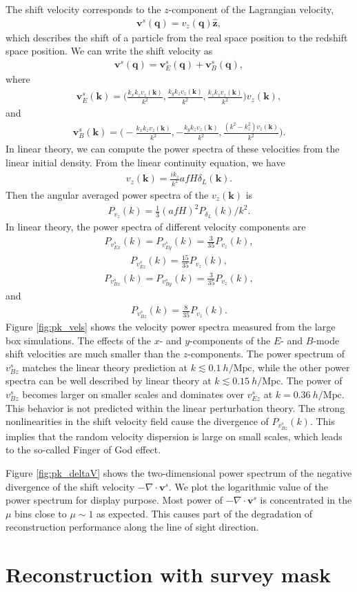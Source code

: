\documentclass[aps,prd,twocolumn,superscriptaddress,groupedaddress,nofootinbib,amsfont]{revtex4}  %
\newcommand{\mr}{\mathrm}
\newcommand{\bea}{\begin{eqnarray}}
\newcommand{\eea}{\end{eqnarray}}
\newcommand{\bmv}{\bm{v}}
\newcommand{\bmk}{\bm{k}}
\newcommand{\bmq}{\bm{q}}
\begin{document}
The shift velocity corresponds to the $z$-component of the Lagrangian velocity,
\bea
\bmv^s(\bmq)=v_z(\bmq)\hat{\bm{z}},
\eea
which describes the shift of a particle from the real space position to the 
redshift space position. We can write the shift velocity as 
\bea
\bmv^s(\bmq)=\bmv_E^s(\bmq)+\bmv^s_B(\bmq),
\eea
where 
\bea
\bmv^s_E(\bmk)=\bigg(\frac{k_xk_zv_z(\bmk)}{k^2},\frac{k_yk_zv_z(\bmk)}{k^2},\frac{k_zk_zv_z(\bmk)}{k^2}\bigg)v_z(\bmk),
\eea
and 
\bea
\bmv^s_B(\bmk)=\bigg(-\frac{k_xk_zv_z(\bmk)}{k^2},-\frac{k_yk_zv_z(\bmk)}{k^2},\frac{(k^2-k_z^2)v_z(\bmk)}{k^2}\bigg).
\eea
In linear theory, we can compute the power spectra of these velocities from the 
linear initial density.
From the linear continuity equation, we have 
\bea
v_z(\bmk)=\frac{ik_z}{k^2}afH\delta_L(\bmk).
\eea
Then the angular averaged power spectra of the $v_z(\bmk)$ is
\bea
P_{v_z}(k)=\frac{1}{3}(afH)^2P_{\delta_L}(k)/{k^2}.
\eea
In linear theory, the power spectra of different velocity components are
\bea
P_{v^s_{Ex}}(k)=P_{v^s_{Ey}}(k)=\frac{3}{35}P_{v_z}(k),
\eea
\bea
P_{v^s_{Ez}}(k)=\frac{15}{35}P_{v_z}(k),
\eea
\bea
P_{v^s_{Bx}}(k)=P_{v^s_{By}}(k)=\frac{3}{35}P_{v_z}(k),
\eea
and
\bea
P_{v^s_{Bz}}(k)=\frac{8}{35}P_{v_z}(k).
\eea
Figure \ref{fig:pk_vels} shows the velocity power spectra measured from the 
large box simulations. The effects of the $x$- and $y$-components of the $E$-
and $B$-mode shift velocities are much smaller than the $z$-components. 
The power spectrum of ${v^s_{Bz}}$ matches the linear theory prediction at 
$k\lesssim0.1\ h/\mr{Mpc}$, while the other power spectra can be well described 
by linear theory at $k\lesssim0.15\ h/\mr{Mpc}$. The power of $v^s_{Bz}$ becomes
larger on smaller scales and dominates over $v^s_{Ez}$ at $k=0.36\ h/\mr{Mpc}$.
This behavior is not predicted within the linear perturbation theory. 
The strong nonlinearities in the shift velocity field cause the divergence of 
$P_{v^s_{Bz}}(k)$. This implies that the random velocity dispersion is large on 
small scales, which leads to the so-called Finger of God effect.

Figure \ref{fig:pk_deltaV} shows the two-dimensional power spectrum of the 
negative divergence of the shift velocity $-\nabla\cdot\bmv^s$.
We plot the logarithmic value of the power spectrum for display purpose.
Most power of $-\nabla\cdot\bmv^s$ is concentrated in the $\mu$ bins close to 
$\mu\sim1$ as expected. This causes part of the degradation of reconstruction
performance along the line of sight direction.

\section{Reconstruction with survey mask}
\label{appendix:E}
\end{document}
